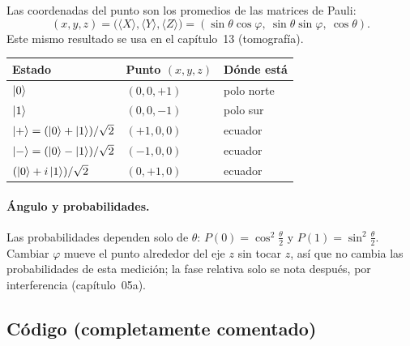 Las coordenadas del punto son los promedios de las matrices de Pauli:
\begin{equation}
  (x,y,z)=\big(\langle X\rangle,\langle Y\rangle,\langle Z\rangle\big)
  =(\sin\theta\cos\varphi,\ \sin\theta\sin\varphi,\ \cos\theta).
\end{equation}
Este mismo resultado se usa en el capítulo~13 (tomografía).

\begin{center}
\begin{tabular}{@{}lll@{}}
\toprule
Estado & Punto $(x,y,z)$ & Dónde está\\
\midrule
$\left|0\right\rangle$ & $(0,0,+1)$ & polo norte\\
$\left|1\right\rangle$ & $(0,0,-1)$ & polo sur\\
$\left|+\right\rangle=(\left|0\right\rangle+\left|1\right\rangle)/\sqrt2$ & $(+1,0,0)$ & ecuador\\
$\left|-\right\rangle=(\left|0\right\rangle-\left|1\right\rangle)/\sqrt2$ & $(-1,0,0)$ & ecuador\\
$(\left|0\right\rangle+i\left|1\right\rangle)/\sqrt2$ & $(0,+1,0)$ & ecuador\\
\bottomrule
\end{tabular}
\end{center}

\paragraph{Ángulo y probabilidades.} Las probabilidades dependen solo de
$\theta$: $P(0)=\cos^2\frac\theta2$ y $P(1)=\sin^2\frac\theta2$. Cambiar
$\varphi$ mueve el punto alrededor del eje $z$ sin tocar $z$, así que no cambia
las probabilidades de esta medición; la fase relativa solo se nota después,
por interferencia (capítulo~05a).

\subsection{Código (completamente comentado)}


